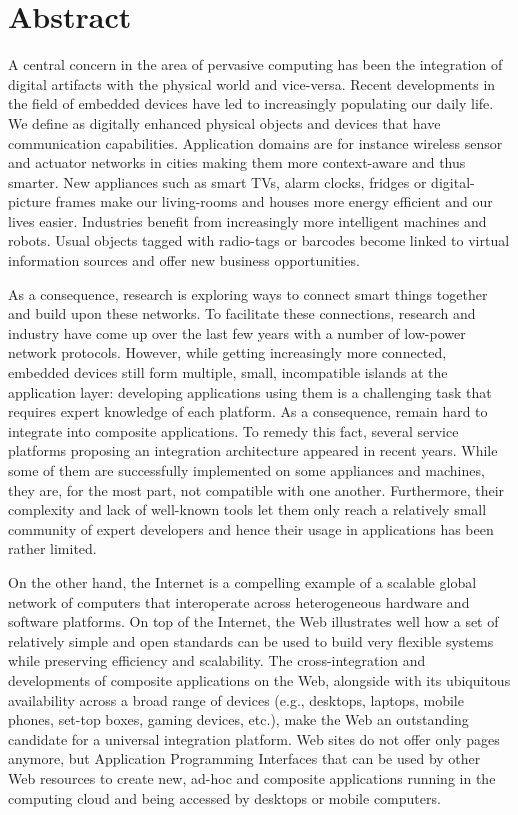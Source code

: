 \chapter*{Abstract}
\vspace{-22pt}

A central concern in the area of pervasive computing has been the integration of digital artifacts with the physical world and vice-versa. Recent developments in the field of embedded devices have led to \newterm{\sts{}} increasingly populating our daily life. We define \sts{} as digitally enhanced physical objects and devices that have communication capabilities. Application domains are for instance wireless sensor and actuator networks in cities making them more context-aware and thus smarter. New appliances such as smart TVs, alarm clocks, fridges or digital-picture frames make our living-rooms and houses more energy efficient and our lives easier. Industries benefit from increasingly more intelligent machines and robots. Usual objects tagged with radio-tags or barcodes become linked to virtual information sources and offer new business opportunities. 

As a consequence,  research is exploring ways to connect smart things together and build upon these networks. To facilitate these connections, research and industry have come up over the last few years with a number of low-power network protocols. However, while getting increasingly more connected, embedded devices still form multiple, small, incompatible islands at the application layer: developing applications using them is a challenging task that requires expert knowledge of each platform. As a consequence, \sts{} remain hard to integrate into composite applications. To remedy this fact, several service platforms proposing an integration architecture appeared in recent years. While some of them are successfully implemented on some appliances and machines, they are, for the most part, not compatible with one another. Furthermore, their complexity and lack of well-known tools let them only reach a relatively small community of expert developers and hence their usage in applications has been rather limited.

On the other hand, the Internet is a compelling example of a scalable global network of computers that interoperate across heterogeneous hardware and software platforms. On top of the Internet, the Web illustrates well how a set of relatively simple and open standards can be used to build very flexible systems while preserving efficiency and scalability. The cross-integration and developments of composite applications on the Web, alongside with its ubiquitous availability across a broad range of devices (e.g., desktops, laptops, mobile phones, set-top boxes, gaming devices, etc.), make the Web an outstanding candidate for a universal integration platform. Web sites do not offer only pages anymore, but Application Programming Interfaces that can be used by other Web resources to create new, ad-hoc and composite applications running in the computing cloud and being accessed by desktops or mobile computers.

